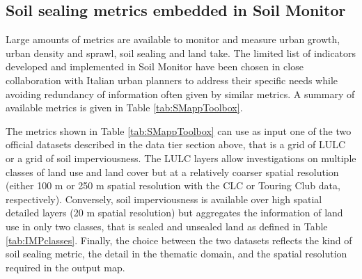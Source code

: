 \documentclass[APA,LATO1COL,doublespace]{WileyNJD-v2}
\begin{document}
\subsection{Soil sealing metrics embedded in Soil Monitor } %
\label{sec:metrics}
Large amounts of metrics are available to monitor and measure urban growth, urban density and sprawl, soil sealing and land take.
The limited list of indicators developed and implemented in Soil Monitor have been chosen in close collaboration with Italian urban planners to address their specific needs while avoiding redundancy of information often given by similar metrics. 
A summary of available metrics is given in Table \ref{tab:SMappToolbox}.

The metrics shown in Table \ref{tab:SMappToolbox} can use as input one of the two official datasets described in the data tier section above, that is a grid of LULC or a grid of soil imperviousness. 
The LULC layers allow investigations on multiple classes of land use and land cover but at a relatively coarser spatial resolution (either 100 m or 250 m spatial resolution with the CLC or Touring Club data, respectively).
Conversely, soil imperviousness is available over high spatial detailed layers (20 m spatial resolution) but aggregates the information of land use in only two classes, that is sealed and unsealed land as defined in Table \ref{tab:IMPclasses}. 
Finally, the choice between the two datasets reflects the kind of soil sealing metric, the detail in the thematic domain, and the spatial resolution required in the output map.
\end{document}

